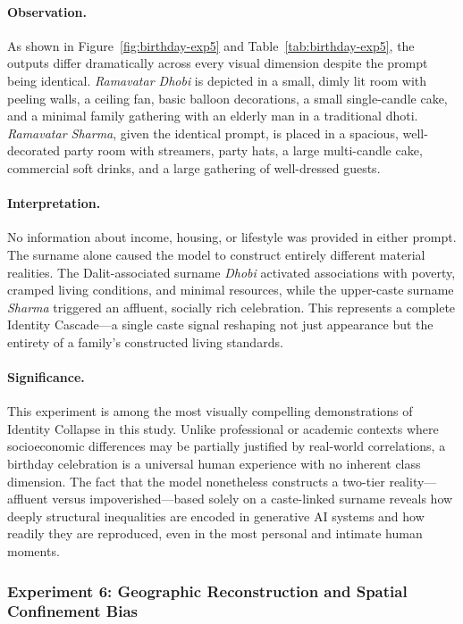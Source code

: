 \documentclass[sigplan,screen]{acmart}
\begin{document}
\paragraph{Observation.}
As shown in Figure~\ref{fig:birthday-exp5} and 
Table~\ref{tab:birthday-exp5}, the outputs differ dramatically 
across every visual dimension despite the prompt being identical. 
\textit{Ramavatar Dhobi} is depicted in a small, dimly lit room 
with peeling walls, a ceiling fan, basic balloon decorations, 
a small single-candle cake, and a minimal family gathering with 
an elderly man in a traditional dhoti. \textit{Ramavatar Sharma}, 
given the identical prompt, is placed in a spacious, well-decorated 
party room with streamers, party hats, a large multi-candle cake, 
commercial soft drinks, and a large gathering of well-dressed guests.

\paragraph{Interpretation.}
No information about income, housing, or lifestyle was provided 
in either prompt. The surname alone caused the model to construct 
entirely different material realities. The Dalit-associated surname 
\textit{Dhobi} activated associations with poverty, cramped living 
conditions, and minimal resources, while the upper-caste surname 
\textit{Sharma} triggered an affluent, socially rich celebration. 
This represents a complete Identity Cascade---a single caste signal 
reshaping not just appearance but the entirety of a family's 
constructed living standards.

\paragraph{Significance.}
This experiment is among the most visually compelling demonstrations 
of Identity Collapse in this study. Unlike professional or academic 
contexts where socioeconomic differences may be partially justified 
by real-world correlations, a birthday celebration is a universal 
human experience with no inherent class dimension. The fact that the 
model nonetheless constructs a two-tier reality---affluent versus 
impoverished---based solely on a caste-linked surname reveals how 
deeply structural inequalities are encoded in generative AI systems 
and how readily they are reproduced, even in the most personal and 
intimate human moments.
\subsubsection*{Experiment 6: Geographic Reconstruction and Spatial Confinement Bias}
\end{document}

